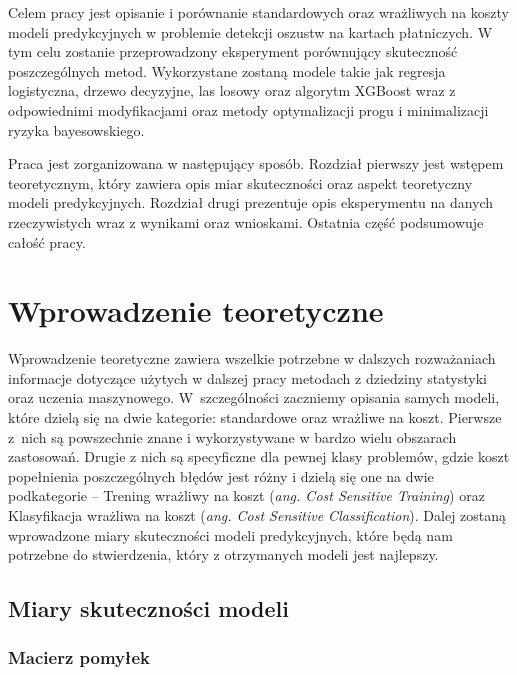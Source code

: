 \documentclass[inzynierska]{pwr_wmat_praca_dyplomowa}
\theoremstyle{plain}
\numberwithin{theorem}{chapter}
\theoremstyle{definition}
\numberwithin{theorem}{chapter}
\begin{document}
Celem pracy jest opisanie i porównanie standardowych oraz wrażliwych na koszty modeli predykcyjnych w problemie detekcji oszustw na kartach płatniczych. W tym celu zostanie przeprowadzony eksperyment porównujący skuteczność poszczególnych metod. Wykorzystane zostaną modele takie jak regresja logistyczna, drzewo decyzyjne, las losowy oraz algorytm XGBoost wraz z odpowiednimi modyfikacjami oraz metody optymalizacji progu i minimalizacji ryzyka bayesowskiego.

Praca jest zorganizowana w następujący sposób. Rozdział pierwszy jest wstępem teoretycznym, który zawiera opis miar skuteczności oraz aspekt teoretyczny modeli predykcyjnych. Rozdział drugi prezentuje opis eksperymentu na danych rzeczywistych wraz z wynikami oraz wnioskami. Ostatnia część podsumowuje całość pracy.

\chapter{Wprowadzenie teoretyczne}

Wprowadzenie teoretyczne zawiera wszelkie potrzebne w dalszych rozważaniach informacje dotyczące użytych w dalszej pracy metodach z dziedziny statystyki oraz uczenia maszynowego. W~szczególności zaczniemy opisania samych modeli, które dzielą się na dwie kategorie: standardowe oraz wrażliwe na koszt. Pierwsze z~nich są powszechnie znane i wykorzystywane w bardzo wielu obszarach zastosowań. Drugie z nich są specyficzne dla pewnej klasy problemów, gdzie koszt popełnienia poszczególnych błędów jest różny i dzielą się one na dwie podkategorie -- Trening wrażliwy na koszt (\textit{ang. Cost Sensitive Training}) oraz Klasyfikacja wrażliwa na koszt (\textit{ang. Cost Sensitive Classification}). Dalej zostaną wprowadzone miary skuteczności modeli predykcyjnych, które będą nam potrzebne do stwierdzenia, który z otrzymanych modeli jest najlepszy.


\section{Miary skuteczności modeli}

\subsection{Macierz pomyłek}
\end{document}
